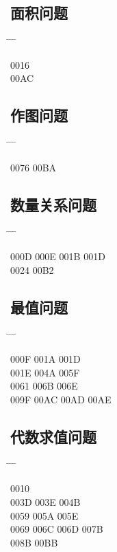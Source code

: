 \documentclass[twoside, twocolumn]{ctexart}
\newenvironment{problist}{
  \begin{center} \ttfamily \begin{tabbing}
      \hspace{50pt} \= \hspace{50pt} \= \hspace{50pt} \= \kill
  }{ \end{tabbing} \end{center} }
\begin{document}
  \subsection*{面积问题}

  \begin{problist}
    0016    \\ 00AC \\
  \end{problist}

  \subsection*{作图问题}

  \begin{problist}
    0076 \> 00BA \\
  \end{problist}

  \subsection*{数量关系问题}

  \begin{problist}
    000D \> 000E \> 001B \> 001D \\ 0024  \> 00B2 \\
  \end{problist}

  \subsection*{最值问题}

  \begin{problist}
    000F  \> 001A \> 001D \\ 001E \> 004A \> 005F  \\
    0061  \> 006B \> 006E \\ 009F \> 00AC \> 00AD \> 00AE \\
  \end{problist}

  \subsection*{代数求值问题}

  \begin{problist}
    0010    \\ 003D \> 003E \> 004B  \\
    0059 \> 005A \> 005E  \\ 0069 \> 006C \> 006D \> 007B \\
    008B \> 00BB \\
  \end{problist}
\end{document}
